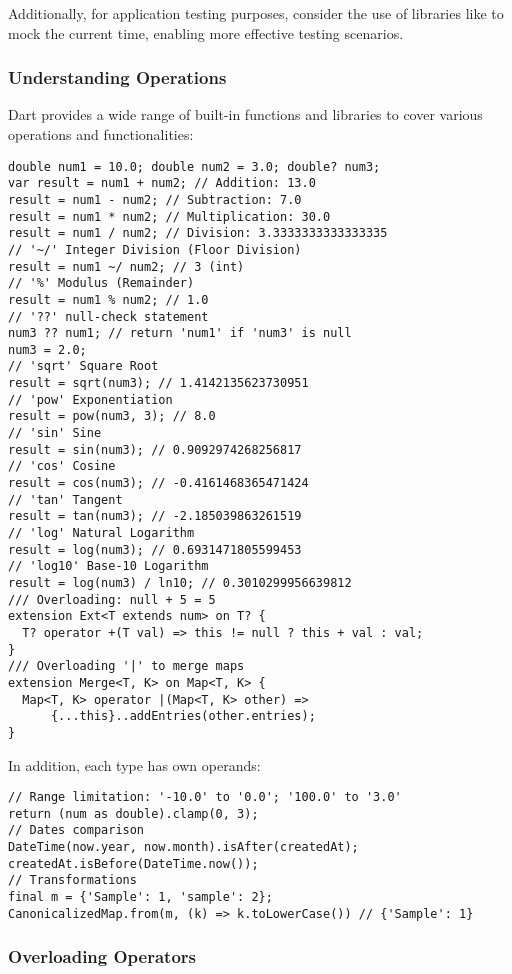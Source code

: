 Additionally, for application testing purposes, consider the use of libraries like  to mock the 
current time, enabling more effective testing scenarios.

\newpage
\subsubsection{Understanding Operations}

Dart provides a wide range of built-in functions and libraries to cover various operations and functionalities:

\begin{lstlisting}
double num1 = 10.0; double num2 = 3.0; double? num3;
var result = num1 + num2; // Addition: 13.0
result = num1 - num2; // Subtraction: 7.0
result = num1 * num2; // Multiplication: 30.0
result = num1 / num2; // Division: 3.3333333333333335
// '~/' Integer Division (Floor Division)
result = num1 ~/ num2; // 3 (int)
// '%' Modulus (Remainder)
result = num1 % num2; // 1.0
// '??' null-check statement
num3 ?? num1; // return 'num1' if 'num3' is null
num3 = 2.0;
// 'sqrt' Square Root
result = sqrt(num3); // 1.4142135623730951
// 'pow' Exponentiation
result = pow(num3, 3); // 8.0
// 'sin' Sine
result = sin(num3); // 0.9092974268256817
// 'cos' Cosine
result = cos(num3); // -0.4161468365471424
// 'tan' Tangent
result = tan(num3); // -2.185039863261519
// 'log' Natural Logarithm
result = log(num3); // 0.6931471805599453
// 'log10' Base-10 Logarithm
result = log(num3) / ln10; // 0.3010299956639812
/// Overloading: null + 5 = 5
extension Ext<T extends num> on T? {
  T? operator +(T val) => this != null ? this + val : val;
}
/// Overloading '|' to merge maps
extension Merge<T, K> on Map<T, K> {
  Map<T, K> operator |(Map<T, K> other) => 
      {...this}..addEntries(other.entries);
}
\end{lstlisting}

\noindent In addition, each type has own operands:

\begin{lstlisting}
// Range limitation: '-10.0' to '0.0'; '100.0' to '3.0'
return (num as double).clamp(0, 3);
// Dates comparison
DateTime(now.year, now.month).isAfter(createdAt);
createdAt.isBefore(DateTime.now());
// Transformations
final m = {'Sample': 1, 'sample': 2};
CanonicalizedMap.from(m, (k) => k.toLowerCase()) // {'Sample': 1}
\end{lstlisting}


\newpage
\subsubsection{Overloading Operators}

